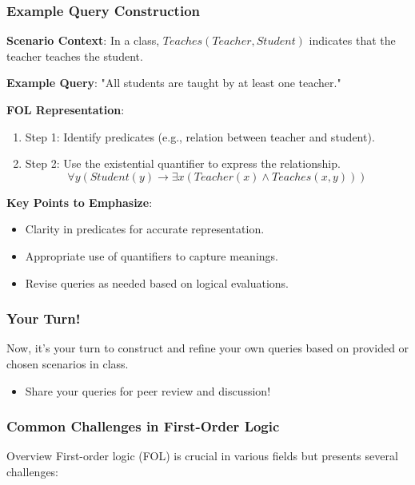 \documentclass[aspectratio=169]{beamer}
\begin{document}
\begin{frame}[fragile]
    \frametitle{Example Query Construction}
    
    \textbf{Scenario Context}:  
    In a class, $Teaches(Teacher, Student)$ indicates that the teacher teaches the student.

    \textbf{Example Query}: "All students are taught by at least one teacher."
    
    \textbf{FOL Representation}:
    \begin{enumerate}
        \item Step 1: Identify predicates (e.g., relation between teacher and student).
        \item Step 2: Use the existential quantifier to express the relationship.
        \begin{equation}
            \forall y (Student(y) \rightarrow \exists x (Teacher(x) \land Teaches(x, y)))
        \end{equation}
    \end{enumerate}
    
    \textbf{Key Points to Emphasize}:
    \begin{itemize}
        \item Clarity in predicates for accurate representation.
        \item Appropriate use of quantifiers to capture meanings.
        \item Revise queries as needed based on logical evaluations.
    \end{itemize}
\end{frame}

\begin{frame}[fragile]
    \frametitle{Your Turn!}
    
    Now, it's your turn to construct and refine your own queries based on provided or chosen scenarios in class. 
    
    \begin{itemize}
        \item Share your queries for peer review and discussion!
    \end{itemize}
\end{frame}

\begin{frame}[fragile]
    \frametitle{Common Challenges in First-Order Logic}
    \begin{block}{Overview}
        First-order logic (FOL) is crucial in various fields but presents several challenges:
    \end{block}
\end{frame}
\end{document}
